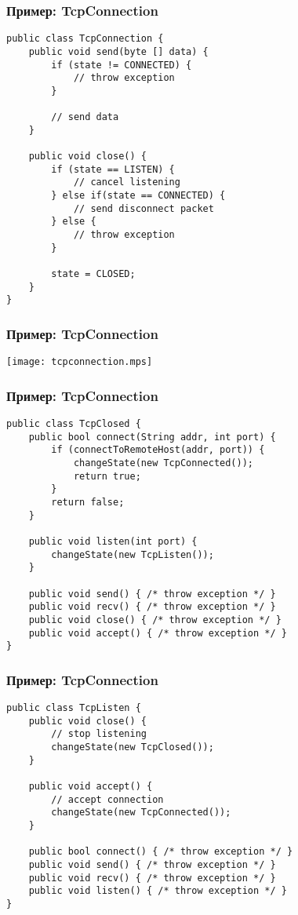 \documentclass[handout]{beamer}
\begin{document}
\begin{frame}[fragile]
\frametitle{Пример: TcpConnection}
\begin{lstlisting}
public class TcpConnection {
    public void send(byte [] data) {
        if (state != CONNECTED) {
            // throw exception
        }
        
        // send data
    }
    
    public void close() {
        if (state == LISTEN) {
            // cancel listening
        } else if(state == CONNECTED) {
            // send disconnect packet
        } else {
            // throw exception
        }
        
        state = CLOSED;
    }
}
\end{lstlisting}
\end{frame}


\begin{frame}[fragile]
\frametitle{Пример: TcpConnection}
\begin{center}
\texttt{[image: tcpconnection.mps]}
\end{center}
\end{frame}


\begin{frame}[fragile]
\frametitle{Пример: TcpConnection}
\begin{lstlisting}
public class TcpClosed {
    public bool connect(String addr, int port) {
        if (connectToRemoteHost(addr, port)) {
            changeState(new TcpConnected());
            return true;
        }
        return false;
    }
    
    public void listen(int port) {
        changeState(new TcpListen());
    }
    
    public void send() { /* throw exception */ }
    public void recv() { /* throw exception */ }    
    public void close() { /* throw exception */ }
    public void accept() { /* throw exception */ }
}
\end{lstlisting}
\end{frame}


\begin{frame}[fragile]
\frametitle{Пример: TcpConnection}
\begin{lstlisting}
public class TcpListen {   
    public void close() {
        // stop listening
        changeState(new TcpClosed());
    }
    
    public void accept() {
        // accept connection
        changeState(new TcpConnected());
    }
    
    public bool connect() { /* throw exception */ }
    public void send() { /* throw exception */ }
    public void recv() { /* throw exception */ }
    public void listen() { /* throw exception */ }
}
\end{lstlisting}
\end{frame}
\end{document}
